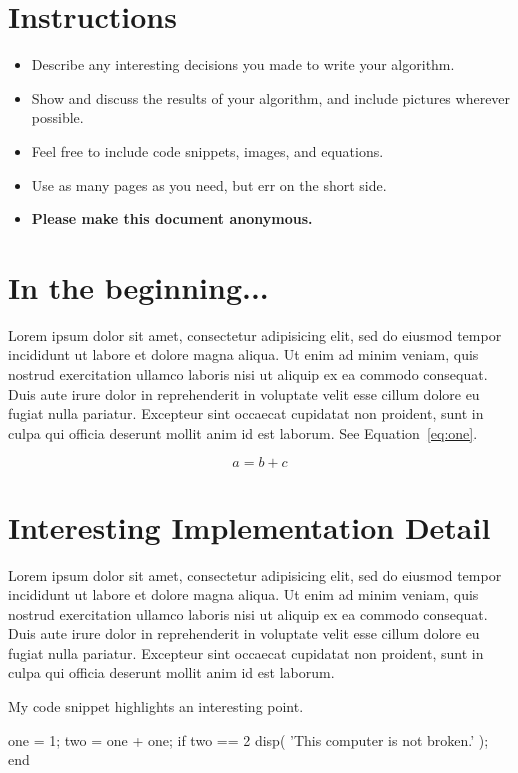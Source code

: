 \section*{Instructions}
\begin{itemize}
  \item Describe any interesting decisions you made to write your algorithm.
  \item Show and discuss the results of your algorithm, and include pictures wherever possible.
  \item Feel free to include code snippets, images, and equations.
  \item Use as many pages as you need, but err on the short side.
  \item \textbf{Please make this document anonymous.}
\end{itemize}

\section*{In the beginning...}

Lorem ipsum dolor sit amet, consectetur adipisicing elit, sed do eiusmod tempor incididunt ut labore et dolore magna aliqua. Ut enim ad minim veniam, quis nostrud exercitation ullamco laboris nisi ut aliquip ex ea commodo consequat. Duis aute irure dolor in reprehenderit in voluptate velit esse cillum dolore eu fugiat nulla pariatur. Excepteur sint occaecat cupidatat non proident, sunt in culpa qui officia deserunt mollit anim id est laborum. See Equation~\ref{eq:one}.

\begin{equation}
a = b + c
\label{eq:one}
\end{equation}

\section*{Interesting Implementation Detail}

Lorem ipsum dolor sit amet, consectetur adipisicing elit, sed do eiusmod tempor incididunt ut labore et dolore magna aliqua. Ut enim ad minim veniam, quis nostrud exercitation ullamco laboris nisi ut aliquip ex ea commodo consequat. Duis aute irure dolor in reprehenderit in voluptate velit esse cillum dolore eu fugiat nulla pariatur. Excepteur sint occaecat cupidatat non proident, sunt in culpa qui officia deserunt mollit anim id est laborum.

My code snippet highlights an interesting point.
\begin{python}
one = 1;
two = one + one;
if two == 2
    disp( 'This computer is not broken.' );
end
\end{python}


